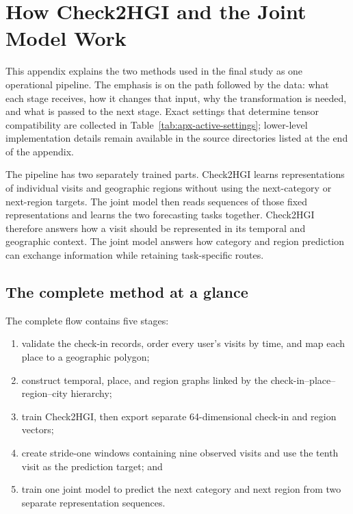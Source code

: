 \chapter{How Check2HGI and the Joint Model Work}
\label{apx:check2hgi-joint-model}

This appendix explains the two methods used in the final study as one operational
pipeline. The emphasis is on the path followed by the data: what each stage
receives, how it changes that input, why the transformation is needed, and what is
passed to the next stage. Exact settings that determine tensor compatibility are
collected in Table~\ref{tab:apx-active-settings}; lower-level implementation details
remain available in the source directories listed at the end of the appendix.

The pipeline has two separately trained parts. Check2HGI learns representations of
individual visits and geographic regions without using the next-category or
next-region targets. The joint model then reads sequences of those fixed
representations and learns the two forecasting tasks together. Check2HGI therefore
answers how a visit should be represented in its temporal and geographic context.
The joint model answers how category and region prediction can exchange information
while retaining task-specific routes.

\section{The complete method at a glance}
\label{sec:apx-methods-pipeline}

The complete flow contains five stages:
\begin{enumerate}
    \item validate the check-in records, order every user's visits by time, and map
    each place to a geographic polygon;
    \item construct temporal, place, and region graphs linked by the
    check-in--place--region--city hierarchy;
    \item train Check2HGI, then export separate 64-dimensional check-in and region
    vectors;
    \item create stride-one windows containing nine observed visits and use the
    tenth visit as the prediction target; and
    \item train one joint model to predict the next category and next region from
    two separate representation sequences.
\end{enumerate}

